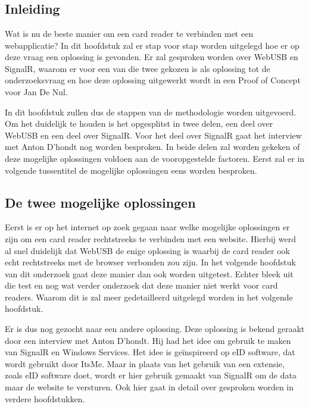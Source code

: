 \graphicspath{{graphics/}}
\chapter{}%
\label{ch:Onderzoek en Proof of Concept}
\section{Inleiding}
Wat is nu de beste manier om een card reader te verbinden met een webapplicatie? In dit hoofdstuk zal er stap voor stap worden uitgelegd hoe er op deze vraag een oplossing is gevonden. Er zal gesproken worden over WebUSB en SignalR, waarom er voor een van die twee gekozen is als oplossing tot de onderzoeksvraag en hoe deze oplossing uitgewerkt wordt in een Proof of Concept voor Jan De Nul.

In dit hoofdstuk zullen dus de stappen van de methodologie worden uitgevoerd. Om het duidelijk te houden is het opgesplitst in twee delen, een deel over WebUSB en een deel over SignalR. Voor het deel over SignalR gaat het interview met Anton D'hondt nog worden besproken. In beide delen zal worden gekeken of deze mogelijke oplossingen voldoen aan de vooropgestelde factoren. 
Eerst zal er in volgende tussentitel de mogelijke oplossingen eens worden besproken.


\section{De twee mogelijke oplossingen}
Eerst is er op het internet op zoek gegaan naar welke mogelijke oplossingen er zijn om een card reader rechtstreeks te verbinden met een website. Hierbij werd al snel duidelijk dat WebUSB de enige oplossing is waarbij de card reader ook echt rechtstreeks met de browser verbonden zou zijn. In het volgende hoofdstuk van dit onderzoek gaat deze manier dan ook worden uitgetest. Echter bleek uit die test en nog wat verder onderzoek dat deze manier niet werkt voor card readers. Waarom dit is zal meer gedetailleerd uitgelegd worden in het volgende hoofdstuk. 

Er is dus nog gezocht naar een andere oplossing. Deze oplossing is bekend geraakt door een interview met Anton D’hondt. Hij had het idee om gebruik te maken van SignalR en Windows Services. Het idee is geïnspireerd op eID software, dat wordt gebruikt door ItsMe. Maar in plaats van het gebruik van een extensie, zoals eID software doet, wordt er hier gebruik gemaakt van SignalR om de data maar de website te versturen. Ook hier gaat in detail over gesproken worden in verdere hoofdstukken. 



